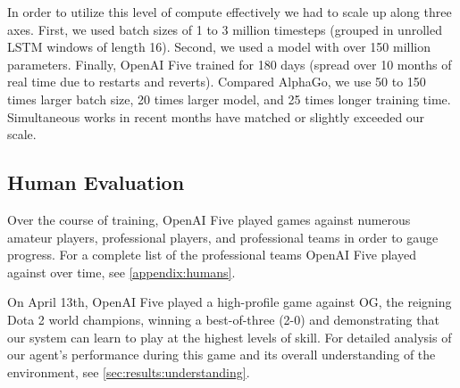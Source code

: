 \documentclass[11pt]{article}
\newcommand\todo[1]{\textcolor{red}{TODO: #1}}
\newcommand{\dota}{Dota 2\xspace}
\newcommand{\openaifive}{OpenAI Five\xspace}
\begin{document}
In order to utilize this level of compute effectively we had to scale up along three axes. 
First, we used batch sizes of 1 to 3 million timesteps (grouped in unrolled LSTM windows of length 16). 
Second, we used a model with over 150 million parameters. 
Finally, OpenAI Five trained for 180 days (spread over 10 months of real time due to restarts and reverts).
Compared AlphaGo\cite{silver2016mastering}, we use 50 to 150 times larger batch size, 20 times larger model, and 25 times longer training time. 
Simultaneous works in recent months\cite{alphastarblog, unpublishedrobotics} have matched or slightly exceeded our scale.


\subsection{Human Evaluation}

Over the course of training, \openaifive played games against numerous amateur players, professional players, and professional teams in order to gauge progress. 
For a complete list of the professional teams \openaifive played against over time, see \autoref{appendix:humans}.

On April 13th, \openaifive played a high-profile game against OG, the reigning \dota world champions, winning a best-of-three (2-0) and demonstrating that our system can learn to play at the highest levels of skill.
For detailed analysis of our agent's performance during this game and its overall understanding of the environment, see \autoref{sec:results:understanding}.
\end{document}
